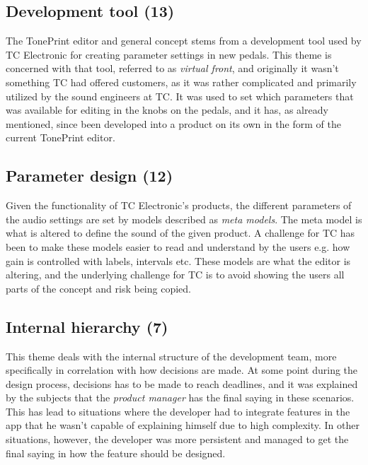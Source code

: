 \subsection*{Development tool (13)}
\label{App:ThemeDevelopmentTool}
The TonePrint editor and general concept stems from a development tool used by TC Electronic for creating parameter settings in new pedals. This theme is concerned with that tool, referred to as \textit{virtual front}, and originally it wasn't something TC had offered customers, as it was rather complicated and primarily utilized by the sound engineers at TC. It was used to set which parameters that was available for editing in the knobs on the pedals, and it has, as already mentioned, since been developed into a product on its own in the form of the current TonePrint editor. 

\subsection*{Parameter design (12)}
\label{App:ThemeParameterDesign}
Given the functionality of TC Electronic's products, the different parameters of the audio settings are set by models described as \textit{meta models}. The meta model is what is altered to define the sound of the given product. A challenge for TC has been to make these models easier to read and understand by the users e.g. how gain is controlled with labels, intervals etc. These models are what the editor is altering, and the underlying challenge for TC is to avoid showing the users all parts of the concept and risk being copied.

\subsection*{Internal hierarchy (7)}
\label{App:ThemeRollAllocation}
This theme deals with the internal structure of the development team, more specifically in correlation with how decisions are made. At some point during the design process, decisions has to be made to reach deadlines, and it was explained by the subjects that the \textit{product manager} has the final saying in these scenarios. This has lead to situations where the developer had to integrate features in the app that he wasn't capable of explaining himself due to high complexity. In other situations, however, the developer was more persistent and managed to get the final saying in how the feature should be designed.

